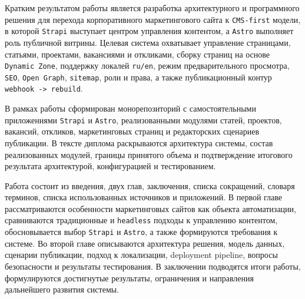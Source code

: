 
Кратким результатом работы является разработка архитектурного и программного решения для
перехода корпоративного маркетингового сайта к \texttt{CMS-first} модели, в которой
\texttt{Strapi} выступает центром управления контентом, а \texttt{Astro} выполняет роль
публичной витрины. Целевая система охватывает управление страницами, статьями, проектами,
вакансиями и откликами, сборку страниц на основе \texttt{Dynamic Zone}, поддержку локалей
\texttt{ru/en}, режим предварительного просмотра, \texttt{SEO}, \texttt{Open Graph},
\texttt{sitemap}, роли и права, а также публикационный контур
\texttt{webhook -> rebuild}.

В рамках работы сформирован монорепозиторий с самостоятельными приложениями
\texttt{Strapi} и \texttt{Astro}, реализованными модулями статей, проектов, вакансий,
откликов, маркетинговых страниц и редакторских сценариев публикации. В тексте диплома
раскрываются архитектура системы, состав реализованных модулей, границы принятого объема и
подтверждение итогового результата архитектурой, конфигурацией и тестированием.


Работа состоит из введения, двух глав, заключения, списка сокращений, словаря терминов,
списка использованных источников и приложений. В первой главе рассматриваются особенности
маркетинговых сайтов как объекта автоматизации, сравниваются традиционные и
\texttt{headless} подходы к управлению контентом, обосновывается выбор \texttt{Strapi} и
\texttt{Astro}, а также формируются требования к системе. Во второй главе описываются
архитектура решения, модель данных, сценарии публикации, подход к локализации, deployment
pipeline, вопросы безопасности и результаты тестирования. В заключении подводятся итоги
работы, формулируются достигнутые результаты, ограничения и направления дальнейшего
развития системы.
